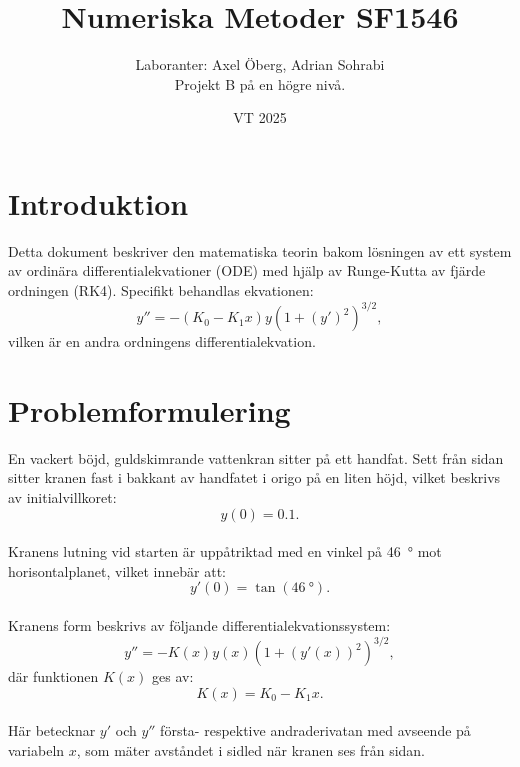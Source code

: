 \documentclass[12pt, letterpaper]{article}
\begin{document}
\title{Numeriska Metoder SF1546}
\author{Laboranter: Axel Öberg, Adrian Sohrabi \\ \small Projekt B på en högre nivå.}
\date{VT 2025}

\maketitle
\newpage
\section{Introduktion}
Detta dokument beskriver den matematiska teorin bakom lösningen av ett system av ordinära differentialekvationer (ODE) med hjälp av Runge-Kutta av fjärde ordningen (RK4). Specifikt behandlas ekvationen:
\begin{equation}
y'' = - (K_0 - K_1 x) y (1 + (y')^2)^{3/2},
\end{equation}
vilken är en andra ordningens differentialekvation.

\section{Problemformulering}
En vackert böjd, guldskimrande vattenkran sitter på ett handfat. Sett från sidan sitter kranen fast i bakkant av handfatet i origo på en liten höjd, vilket beskrivs av initialvillkoret:
\begin{equation}
y(0) = 0.1.
\end{equation}\\
Kranens lutning vid starten är uppåtriktad med en vinkel på \SI{46}{\degree} mot horisontalplanet, vilket innebär att:
\begin{equation}
y'(0) = \tan(\SI{46}{\degree}).
\end{equation}\\
Kranens form beskrivs av följande differentialekvationssystem:
\begin{equation}
y'' = -K(x)y(x)(1 + (y'(x))^2)^{3/2},
\end{equation}
där funktionen $K(x)$ ges av:
\begin{equation}
K(x) = K_0 - K_1 x.
\end{equation}\\
Här betecknar $y'$ och $y''$ första- respektive andraderivatan med avseende på variabeln $x$, som mäter avståndet i sidled när kranen ses från sidan.
\end{document}
